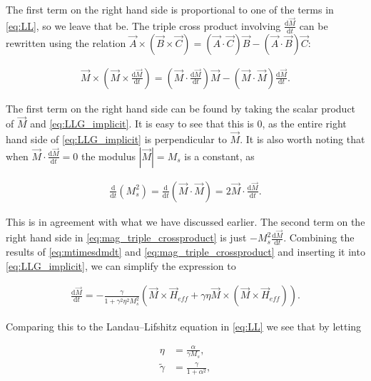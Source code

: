 \documentclass[1p]{elsarticle}		%
\numberwithin{equation}{section}
\begin{document}
The first term on the right hand side is proportional to one of the terms in \eqref{eq:LL}, so we leave that be. The triple cross product involving $\frac{\textrm{d} \vec{M}}{\textrm{d} t}$ can be rewritten using the relation $\vec{A}\times(\vec{B}\times\vec{C}) = (\vec{A}\cdot\vec{C})\vec{B} - (\vec{A}\cdot\vec{B})\vec{C}$:

\begin{align}
\label{eq:mag_triple_crossproduct}
\vec{M}\times(\vec{M}\times\frac{\textrm{d} \vec{M}}{\textrm{d} t}) =  (\vec{M}\cdot\frac{\textrm{d} \vec{M}}{\textrm{d} t})\vec{M} - (\vec{M}\cdot\vec{M})\frac{\textrm{d} \vec{M}}{\textrm{d} t}.
\end{align}

The first term on the right hand side can be found by taking the scalar product of $\vec{M}$ and \eqref{eq:LLG_implicit}. It is easy to see that this is 0, as the entire right hand side of \eqref{eq:LLG_implicit} is perpendicular to $\vec{M}$. It is also worth noting that when $\vec{M}\cdot \frac{\textrm{d} \vec{M}}{\textrm{d} t} = 0$ the modulus $|\vec{M}| = M_s$ is a constant, as 

\begin{align}
\frac{\textrm{d}}{\textrm{d} t} (M_s^2) = \frac{\textrm{d}}{\textrm{d} t} (\vec{M}\cdot\vec{M}) = 2 \vec{M} \cdot \frac{\textrm{d} \vec{M}}{\textrm{d} t}.
\end{align}

This is in agreement with what we have discussed earlier. The second term on the right hand side in \eqref{eq:mag_triple_crossproduct} is just $-M_s^2 \frac{\textrm{d} \vec{M}}{\textrm{d} t}$. Combining the results of \eqref{eq:mtimesdmdt} and \eqref{eq:mag_triple_crossproduct} and inserting it into \eqref{eq:LLG_implicit}, we can simplify the expression to

\begin{align}
\label{eq:LLG_oldparam}
\frac{\textrm{d} \vec{M}}{\textrm{d} t} = -\frac{\gamma}{1 + \gamma^2\eta^2 M_s^2}(\vec{M}\times\vec{H}_{eff} + \gamma\eta \vec{M} \times (\vec{M}\times\vec{H}_{eff})).
\end{align}

Comparing this to the Landau--Lifshitz equation in \eqref{eq:LL} we see that by letting

\begin{align}
\eta &= \frac{\alpha}{\gamma M_s}, \\
\tilde{\gamma} &= \frac{\gamma}{1+\alpha^2},
\end{align}
\end{document}
